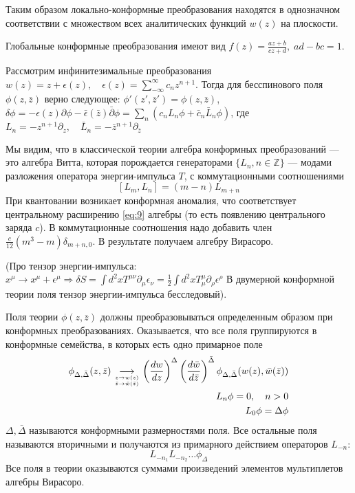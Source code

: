 Таким образом локально-конформные преобразования находятся в однозначном соответствии с множеством
всех аналитических функций $w(z)$ на плоскости.  

Глобальные конформные преобразования имеют вид $f(z)=\frac{az+b}{cz+d},\; ad-bc=1$. 

Рассмотрим инфинитезимальные преобразования $w(z)=z+\epsilon(z),\quad
\epsilon(z)=\sum_{-\infty}^{\infty}c_nz^{n+1}$. 
Тогда для бесспинового поля $\phi(z,\bar z)$ верно следующее: $\phi'(z',\bar z')=\phi(z,\bar z)$,
$\delta\phi=-\epsilon(z)\partial\phi-\bar \epsilon(\bar z)\bar \partial \phi=\sum_n(c_n L_n\phi+\bar
c_n\bar L_n\phi)$, где $L_n=-z^{n+1}\partial_z,\quad \bar L_n=-\bar z^{n+1}\partial_{\bar z}$

Мы видим, что в классической теории алгебра конформных преобразований --- это алгебра Витта, которая
порождается генераторами $\{L_n, n\in \mathbb{Z}\}$ --- модами разложения оператора энергии-импульса $T$, с
коммутационными соотношениями
\begin{equation}
  \label{eq:2}
  [L_m,L_n]=(m-n)L_{m+n}
\end{equation}
При квантовании возникает конформная аномалия, что соответствует центральному расширению \eqref{eq:9} алгебры  (то
есть появлению центрального заряда $c$). В коммутационные соотношения надо добавить член
$\frac{c}{12}(m^3-m)\delta_{m+n,0}$. В результате получаем алгебру Вирасоро.

(Про тензор энергии-импульса:
$x^{\mu}\to x^{\mu}+\epsilon^{\mu}\Rightarrow \delta S=\int d^2 x
T^{\mu\nu}\partial_{\mu}\epsilon_{\nu}=
\frac{1}{2}\int d^2 xT_{\mu}^{\mu}\partial_{\rho}\epsilon^{\rho}$
В двумерной конформной теории поля тензор энергии-импульса бесследовый).

Поля теории $\phi(z,\bar z)$ должны преобразовываться определенным образом при конформных преобразованиях.
Оказывается, что все поля группируются в конформные семейства, в которых есть одно примарное поле
\begin{equation}
  \label{eq:3}
  \begin{split}
    \phi_{\Delta,\bar \Delta}(z,\bar z)\underset{
      \genfrac{}{}{0pt}{}{z\to w(z)}
        {\bar z \to \bar w(\bar z)}
    }
    {\longrightarrow} \left(\frac{dw}{dz}\right)^{\Delta}\left(\frac{d\bar w}{d\bar
        z}\right)^{\bar\Delta}\phi_{\Delta,\bar \Delta}(w(z),\bar w(\bar z))\\
    L_n \phi=0,\quad n>0\\
    L_0 \phi=\Delta \phi\\
  \end{split}
\end{equation}
$\Delta, \bar \Delta$ называются конформными размерностями поля.
Все остальные поля называются вторичными и получаются из примарного действием операторов $L_{-n}$:
\begin{equation}
  \label{eq:67}
  L_{-n_1}L_{-n_2}\dots \phi_{\Delta}
\end{equation}
Все поля в теории оказываются суммами произведений элементов мультиплетов алгебры Вирасоро.

